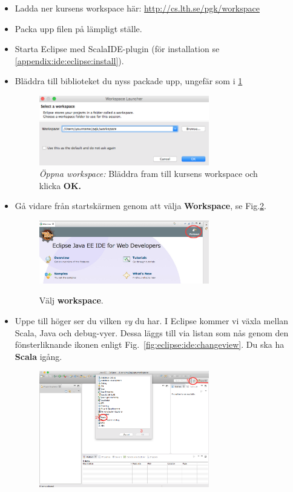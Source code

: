 \begin{itemize}
\item Ladda ner kursens workspace här: \url{http://cs.lth.se/pgk/workspace}
\item Packa upp filen på lämpligt ställe.
\item Starta Eclipse med ScalaIDE-plugin (för installation se \ref{appendix:ide:eclipse:install}).
\item Bläddra till biblioteket du nyss packade upp, ungefär som i \ref{fig:eclipse:ide:open}
\begin{figure}[H]
\centering
\includegraphics[width=0.7\textwidth]{../img/pirates/selectws.png}
\caption { \emph{Öppna workspace:} Bläddra fram till kursens workspace och klicka {\bf OK. }}
\label{fig:eclipse:ide:open}
\end{figure}

\item Gå vidare från startskärmen genom att välja {\bf Workspace}, se Fig.\ref{fig:eclipse:ide:selectws}.
\begin{figure}[H]
\centering
\includegraphics[width=0.7\textwidth]{../img/pirates/selectws2.png} \\

\caption {Välj {\bf workspace}.}
\label{fig:eclipse:ide:selectws}
\end{figure}

\item Uppe till höger ser du vilken \emph{vy} du har. I Eclipse kommer vi växla mellan Scala, Java och debug-vyer. Dessa läggs till via listan som nås genom den fönsterliknande ikonen enligt Fig.~\ref{fig:eclipse:ide:changeview}. Du ska ha {\bf Scala} igång.

\begin{figure}[H]
\centering
\includegraphics[width=0.7\textwidth]{../img/pirates/selectscala.png} 


\end{figure}
\end{itemize}
